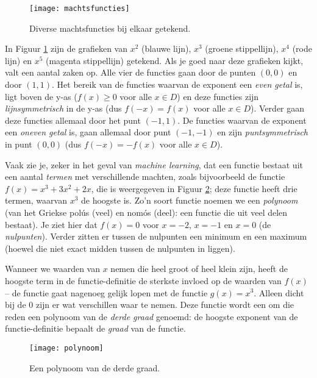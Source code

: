\begin{figure}[h]
    \centering
    \texttt{[image: machtsfuncties]}
    \caption{Diverse machtsfuncties bij elkaar getekend.\label{img:machtsfuncties}}
\end{figure}

In Figuur \ref{img:machtsfuncties} zijn de grafieken van $x^2$ (blauwe lijn), $x^3$ (groene stippellijn), $x^4$ (rode lijn) en $x^5$ (magenta stippellijn) getekend. Als je goed naar deze grafieken kijkt, valt een aantal zaken op. Alle vier de functies gaan door de punten $(0,0)$ en door $(1,1)$. Het bereik van de functies waarvan de exponent een \textit{even getal} is, ligt boven de y-as ($f(x) \geq 0$ voor alle $x \in D$) en deze functies zijn \textit{lijnsymmetrisch} in de y-as (dus $f(-x) = f(x)$ voor alle $x \in D$). Verder gaan deze functies allemaal door het punt $(-1, 1)$. De functies waarvan de exponent een \textit{oneven getal} is, gaan allemaal door punt $(-1,-1)$ en zijn \textit{puntsymmetrisch} in punt $(0,0)$ (dus $f(-x)=-f(x)$ voor alle $x \in D$).

Vaak zie je, zeker in het geval van \textit{machine learning}, dat een functie bestaat uit een aantal \textit{termen} met verschillende machten, zoals bijvoorbeeld de functie $f(x) = x^3+3x^2+2x$, die is weergegeven in Figuur \ref{img:polynoom}; deze functie heeft drie termen, waarvan $x^3$ de hoogste is. Zo'n soort functie noemen we een \textit{polynoom} (van het Griekse polús (veel) en nomós (deel): een functie die uit veel delen bestaat). Je ziet hier dat $f(x)=0$ voor $x=-2$, $x=-1$ en $x=0$ (de \textit{nulpunten}). Verder zitten er tussen de nulpunten een minimum en een maximum (hoewel die niet exact midden tussen de nulpunten in liggen). 

Wanneer we waarden van $x$ nemen die heel groot of heel klein zijn, heeft de hoogste term in de functie-definitie de sterkste invloed op de waarden van $f(x)$ – de functie gaat nagenoeg gelijk lopen met de functie $g(x)=x^3$. Alleen dicht bij de 0 zijn er wat verschillen waar te nemen. Deze functie wordt een om die reden een polynoom van de \textit{derde graad} genoemd: de hoogste exponent van de functie-definitie bepaalt de \textit{graad} van de functie. 

\begin{figure}[h]
    \centering
    \texttt{[image: polynoom]}
    \caption{Een polynoom van de derde graad.\label{img:polynoom}}
\end{figure}


